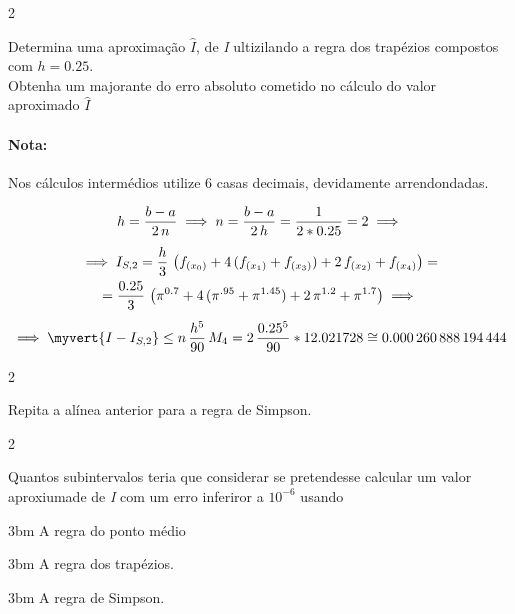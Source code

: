 \documentclass["CN_A-Exercises_Resolutions.tex"]{subfiles}
\begin{document}
\begin{questionBox}2{} %

  Determina uma aproximação \(\hat{I}\), de \textit{I} ultizilando a regra dos trapézios compostos com \(h=0.25\).
  \\ Obtenha um majorante do erro absoluto cometido no cálculo do valor aproximado \(\hat{I}\)
  \paragraph*{Nota:} Nos cálculos intermédios utilize 6 casas decimais, devidamente arrendondadas.

  \answer{}

  \begin{gather*}
    h=\frac{b-a}{2\,n}
    \implies
    n 
    = \frac{b-a}{2\,h}
    = \frac{1}{2*0.25}
    = 2
    \implies \\[1ex]
    \implies
    I_{S,2}
    = \frac{h}{3}
    \,\left(
      f_{(x_0)}
      + 4\,(f_{(x_1)}+f_{(x_3)})
      + 2\,f_{(x_2)}
      + f_{(x_4)}
    \right)
    = \\
    = \frac{0.25}{3}
    \,\left(
      \pi^{0.7}
      + 4\,(\pi^{.95} + \pi^{1.45})
      + 2\,\pi^{1.2}
      + \pi^{1.7}
    \right)
    \implies \\[1ex]
    \implies
    \myvert{I-I_{S,2}}
    \leq n\,\frac{h^5}{90}\,M_4
    = 2\,\frac{0.25^5}{90}*12.021728
    \cong\num{0.000260888194444}
  \end{gather*}

\end{questionBox}

\begin{questionBox}2{} %

  Repita a alínea anterior para a regra de Simpson.

\end{questionBox}

\begin{questionBox}2{} %

  Quantos subintervalos teria que considerar se pretendesse calcular um valor aproxiumade de \textit{I} com um erro inferiror a \(10^{-6}\) usando

  \begin{questionBox}3bm{ A regra do ponto médio } %
  \end{questionBox}
  \begin{questionBox}3bm{ A regra dos trapézios. } %
  \end{questionBox}
  \begin{questionBox}3bm{ A regra de Simpson. } %
  \end{questionBox}

\end{questionBox}
\end{document}
